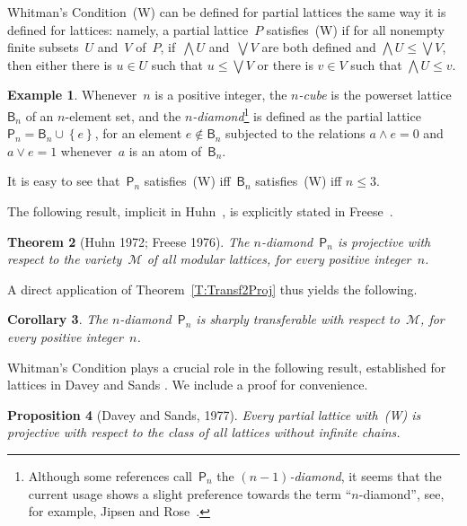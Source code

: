 \documentclass[reqno]{amsart}
\numberwithin{equation}{section}
\theoremstyle{plain}
\newtheorem{theorem}{Theorem}[section]
\newtheorem{proposition}[theorem]{Proposition}
\newtheorem{corollary}[theorem]{Corollary}
\theoremstyle{definition}
\newtheorem{example}[theorem]{Example}
\theoremstyle{remark}
\numberwithin{figure}{section}
\numberwithin{table}{section}
\begin{document}
Whitman's Condition~(W) can be defined for partial lattices the same way it is defined for lattices: namely, a partial lattice~$P$ satisfies~(W) if for all nonempty finite subsets~$U$ and~$V$ of~$P$, if~$\bigwedge U$ and~$\bigvee V$ are both defined and $\bigwedge U\leq\bigvee V$, then either there is $u\in U$ such that $u\leq\bigvee V$ or there is $v\in V$ such that $\bigwedge U\leq v$.

\begin{example}\label{Ex:Diamond}
Whenever~$n$ is a positive integer, the \emph{$n$-cube} is the  powerset lattice~${{\mathsf{B}}}_n$ of an $n$-element set, and the \emph{$n$-diamond}\footnote{Although some references call~${{\mathsf{P}}}_n$ the \emph{$(n-1)$-diamond}, it seems that the current usage shows a slight preference towards the term ``$n$-diamond'', see, for example, Jipsen and Rose~\cite[Section~3.3]{JiRo92}.}
is defined as the partial lattice ${{\mathsf{P}}}_n={{\mathsf{B}}}_n\cup{\left\{{e}\right\}}$, for an element $e\notin{{\mathsf{B}}}_n$ subjected to the relations $a\wedge e=0$ and $a\vee e=1$ whenever~$a$ is an atom of~${{\mathsf{B}}}_n$.

It is easy to see that~${{\mathsf{P}}}_n$ satisfies~(W) if{f}~${{\mathsf{B}}}_n$ satisfies~(W) if{f} $n\leq3$.
\end{example}

The following result, implicit in Huhn~\cite{Huhn72}, is explicitly stated in Freese~\cite{Freese76}.

\begin{theorem}[Huhn 1972; Freese 1976]\label{T:DiamProj}
The $n$-diamond~${{\mathsf{P}}}_n$ is projective with respect to the variety~${\mathcal{M}}$ of all modular lattices, for every positive integer~$n$.
\end{theorem}

A direct application of Theorem~\ref{T:Transf2Proj} thus yields the following.

\begin{corollary}\label{C:DiamProj}
The $n$-diamond~${{\mathsf{P}}}_n$ is sharply transferable with respect to~${\mathcal{M}}$, for every positive integer~$n$.
\end{corollary}

Whitman's Condition plays a crucial role in the following result, established for lattices in Davey and Sands \cite[Theorem~1]{DavSan}.
We include a proof for convenience.

\begin{proposition}[Davey and Sands, 1977]\label{P:DavSands}
Every partial lattice with~\textup{(W)} is projective with respect to the class of all lattices without infinite chains.
\end{proposition}
\end{document}
